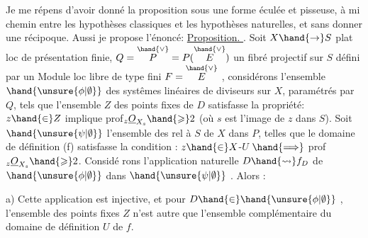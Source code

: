 \margin{$|$}
Je me répens d'avoir donné la proposition  sous une forme éculée et
pisseuse, à mi chemin entre  les hypothèses classiques et les hypothèses
naturelles, et sans donner une récipoque. Aussi je propose l'énoncé:
\uline{Proposition. }.  Soit $X \hand{\to} S$ plat loc de présentation
finie,  $Q=\overset{\hand{\vee}}{P} = P(\overset{\hand{\vee}}{E})$  un fibré  projectif sur $S$ défini par
un Module loc  libre de type fini $F = \overset{\hand{\vee}}{E}$ ,  considérons l'ensemble
$\hand{\unsure{\phi|\emptyset}}$  des systêmes linéaires  de diviseurs  sur $X$, paramétrés par $Q$, tels
que l'ensemble  $Z$ des points fixes de $D$  satisfasse la propriété: $z \hand{\in} Z$
implique prof$_z \underline{O}_{X_s} \hand{\geqslant} 2$  (où  $s$  est l'image de $z$ dans $S$). 
  Soit $\hand{\unsure{\psi|\emptyset}}$ l'ensemble des   rel à
$S$ \deleted{\unsure{*}} de $X$ dans  $P$, telles que le domaine de définition (f)
 satisfasse la condition : $z \hand{\in} X$-$U$ $\hand{\Longrightarrow}$ prof$_z \underline{O}_{X_s} \hand{\geqslant} 2$. Considé
rons l'application naturelle  $D \hand{\rightsquigarrow} f_D$  de $\hand{\unsure{\phi|\emptyset}}$  dans $\hand{\unsure{\psi|\emptyset}}$ .  Alors :

a)  Cette application est injective,  et  pour $D \hand{\in} \hand{\unsure{\phi|\emptyset}}$ , l'ensemble des
points fixes $Z$  n'est autre que l'ensemble  complémentaire du domaine de
définition  $U$ de $f$.

